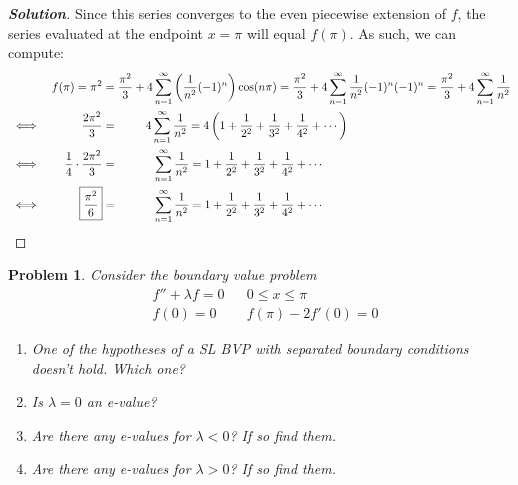 \documentclass[a4paper,12pt]{article} %
\theoremstyle{plain}
\newtheorem{problem}{Problem}
\begin{document}
\begin{proof}[\textbf{Solution}]
    Since this series converges to the even piecewise extension of $f$, the series evaluated at the endpoint $x=\pi$ will equal $f(\pi)$. As such, we can compute:
    \begin{align*}
    &&f(\pi) = \pi^2 &= \frac{\pi^2}{3} + 4\sum_{n=1}^\infty \left(\frac{1}{n^2 }(-1)^n\right)\cos(n\pi) = \frac{\pi^2}{3} + 4\sum_{n=1}^\infty \frac{1}{n^2 }(-1)^n(-1)^n = \frac{\pi^2}{3} + 4\sum_{n=1}^\infty \frac{1}{n^2 } \\
    &\iff& \frac{2\pi^2}{3} & = \hphantom{\frac{\pi^2}{3} +\ } 4\sum_{n=1}^\infty \frac{1}{n^2 } = 4\left(1 + \frac{1}{2^2} + \frac{1}{3^2} + \frac{1}{4^2} + \cdots\right) \\
    &\iff& \frac{1}{4} \cdot \frac{2\pi^2}{3} &= \hphantom{\frac{\pi^2}{3} + 4} \sum_{n=1}^\infty \frac{1}{n^2 } = 1 + \frac{1}{2^2} + \frac{1}{3^2} + \frac{1}{4^2} + \cdots\\
    &\iff& \boxed{\frac{\pi^2}{6}} &= \hphantom{\frac{\pi^2}{3} + 4} \sum_{n=1}^\infty \frac{1}{n^2 } = 1 + \frac{1}{2^2} + \frac{1}{3^2} + \frac{1}{4^2} + \cdots
    \end{align*}
    
\end{proof}

\begin{problem} %
    Consider the boundary value problem
    \begin{align*}
        &f'' + \lambda f = 0 &  &0 \leq x \leq \pi \\
        &f(0) = 0 && f(\pi) -2f'(0) = 0
    \end{align*}
    
    \begin{enumerate}[label=\alph*.)]
        \item One of the hypotheses of a SL BVP with separated boundary conditions doesn't hold. Which one?
        \item Is $\lambda =0$ an e-value?
        \item Are there any e-values for $\lambda < 0$? If so find them.
        \item Are there any e-values for $\lambda > 0$? If so find them.
    \end{enumerate}
\end{problem}
\end{document}
